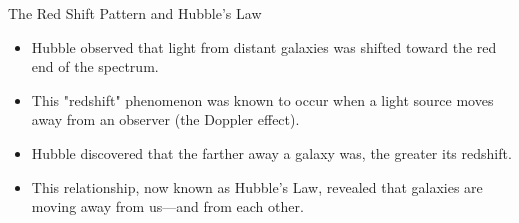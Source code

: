 \documentclass{beamer}
\begin{document}
\begin{frame}{The Red Shift Pattern and Hubble's Law}
    \begin{itemize}
        \item Hubble observed that light from distant galaxies was shifted toward the red end of the spectrum.
        \item This "redshift" phenomenon was known to occur when a light source moves away from an observer (the Doppler effect).
        \item Hubble discovered that the farther away a galaxy was, the greater its redshift.
        \item This relationship, now known as Hubble's Law, revealed that galaxies are moving away from us—and from each other.
    \end{itemize}
    
    \begin{center}
    \end{center}
\end{frame}
\end{document}
